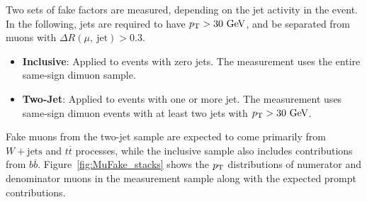Two sets of fake factors are measured, depending on the jet activity in the event. In the following, jets are required to have $p_{\text{T}}>30~\mbox{GeV}$, and be separated from muons with $\Delta R(\mu,\ \mbox{jet})>0.3$. 
\begin{itemize}
  \item \textbf{Inclusive}: Applied to events with zero jets. The measurement uses the entire same-sign dimuon sample.
  \item \textbf{Two-Jet}: Applied to events with one or more jet. The measurement uses same-sign dimuon events with at least two jets with $p_{\text{T}}>30~\mbox{GeV}$. 
\end{itemize}
Fake muons from the two-jet sample are expected to come primarily from $W+\mbox{jets}$ and $t\overline{t}$ processes, while the inclusive sample also includes contributions from $b\overline{b}$. Figure~\ref{fig:MuFake_stacks} shows the $p_{\text{T}}$ distributions of numerator and denominator muons in the measurement sample along with the expected prompt
contributions. 
